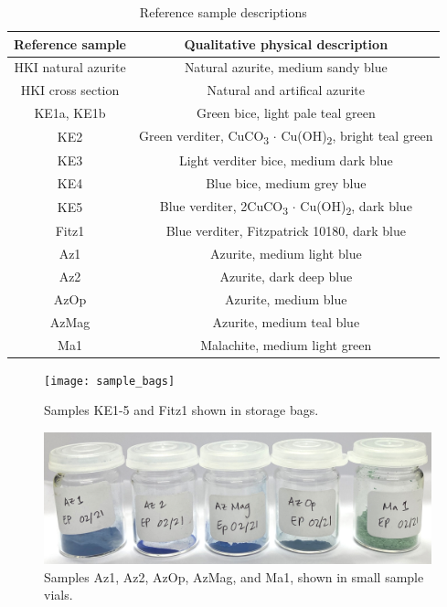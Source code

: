\begin{table}[H]
\caption{Reference sample descriptions}
\centering
\label{table:ref_sample}
\begin{tabular}{c c}
\toprule
Reference sample & Qualitative physical description \\
\midrule
HKI natural azurite & Natural azurite, medium sandy blue \\
HKI cross section & Natural and artifical azurite \\
KE1a, KE1b & Green bice, light pale teal green \\
KE2 & Green verditer, CuCO\textsubscript{3} $\cdot$ Cu(OH)\textsubscript{2}, bright teal green \\
KE3 & Light verditer bice, medium dark blue \\
KE4 & Blue bice, medium grey blue \\
KE5 & Blue verditer, 2CuCO\textsubscript{3} $\cdot$ Cu(OH)\textsubscript{2}, dark blue \\
Fitz1 & Blue verditer, Fitzpatrick 10180, dark blue \\
Az1 & Azurite, medium light blue \\
Az2 & Azurite, dark deep blue \\
AzOp & Azurite, medium blue \\
AzMag & Azurite, medium teal blue \\
Ma1 & Malachite, medium light green \\
\bottomrule
\end{tabular}
\end{table}

\begin{figure}[H]
\centering
  \texttt{[image: sample\_bags]}
\caption[Samples KE1-5 and Fitz1.]{Samples KE1-5 and Fitz1 shown in storage bags.}
\label{fig:sample_bags}
\end{figure}

\begin{figure}[H]
\centering
  \includegraphics[width=0.75\linewidth]{sample_vials}
\caption[Samples Az1, Az2, AzOp, AzMag, and Ma1.]{Samples Az1, Az2, AzOp, AzMag, and Ma1, shown in small sample vials.}
\label{fig:sample_vials}
\end{figure}

